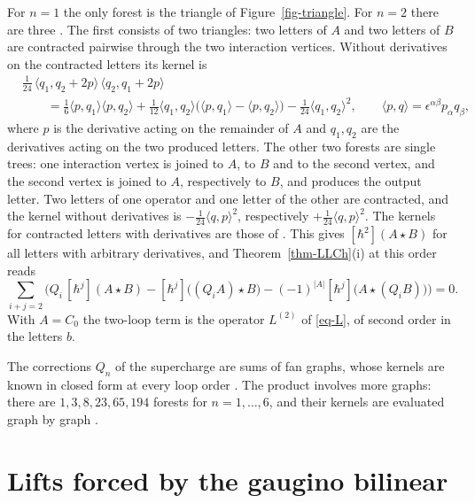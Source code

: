 \documentclass[11pt]{article}
\numberwithin{equation}{section}
\numberwithin{figure}{section}
\numberwithin{table}{section}
\theoremstyle{definition}
\begin{document}
For $n=1$ the only forest is the triangle of Figure~\ref{fig-triangle}. For $n=2$ there are three \cite[Equation~(6.29) and Figure~6.3]{LLCh}. The first consists of two triangles: two letters of $A$ and two letters of $B$ are contracted pairwise through the two interaction vertices. Without derivatives on the contracted letters its kernel is \cite[Equation~(6.30)]{LLCh}
\begin{equation}\label{eq-book}
\begin{aligned}
&\tfrac1{24}\,\langle q_1,q_2+2p\rangle\,\langle q_2,q_1+2p\rangle\\
&\qquad=\tfrac16\langle p,q_1\rangle\langle p,q_2\rangle+\tfrac1{12}\langle q_1,q_2\rangle\big(\langle p,q_1\rangle-\langle p,q_2\rangle\big)-\tfrac1{24}\langle q_1,q_2\rangle^2,
\qquad \langle p,q\rangle=\epsilon^{\alpha\beta}p_\alpha q_\beta,
\end{aligned}
\end{equation}
where $p$ is the derivative acting on the remainder of $A$ and $q_1,q_2$ are the derivatives acting on the two produced letters. The other two forests are single trees: one interaction vertex is joined to $A$, to $B$ and to the second vertex, and the second vertex is joined to $A$, respectively to $B$, and produces the output letter. Two letters of one operator and one letter of the other are contracted, and the kernel without derivatives is $-\tfrac1{24}\langle q,p\rangle^2$, respectively $+\tfrac1{24}\langle q,p\rangle^2$. The kernels for contracted letters with derivatives are those of \cite[Equations~(6.31)--(6.33)]{LLCh}. This gives $[\hbar^2](A\star B)$ for all letters with arbitrary derivatives, and Theorem~\ref{thm-LLCh}(i) at this order reads
\begin{equation}\label{eq-leibniz2}
\sum_{i+j=2}\Big(Q_i\,[\hbar^j](A\star B)-[\hbar^j]\big((Q_iA)\star B\big)-(-1)^{|A|}[\hbar^j]\big(A\star(Q_iB)\big)\Big)=0 .
\end{equation}
With $A=C_0$ the two-loop term is the operator $L^{(2)}$ of \eqref{eq-L}, of second order in the letters $b$.

The corrections $Q_n$ of the supercharge are sums of fan graphs, whose kernels are known in closed form at every loop order \cite[Section~5]{LLCh}. The product involves more graphs: there are $1,3,8,23,65,194$ forests for $n=1,\dots,6$, and their kernels are evaluated graph by graph \cite[Section~7]{LLCh}.

\section{Lifts forced by the gaugino bilinear}\label{sec-mechanism}
\end{document}
